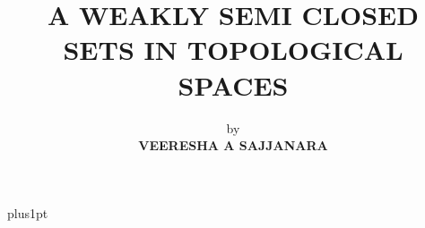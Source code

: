 \documentclass[oneside,12pt]{Classes/VTU}
\title{A WEAKLY SEMI CLOSED SETS IN TOPOLOGICAL SPACES}
\author{by \\ \vspace{1mm}\textbf{VEERESHA A SAJJANARA} \vspace{1mm}}
\theoremstyle{definition}
\begin{document}
\renewcommand\baselinestretch{1.2}
\baselineskip=18pt plus1pt

~ \maketitle

\setcounter{secnumdepth}{3}
\setcounter{tocdepth}{3}

~ \begin{romanpages}


~ \normalsize{\tableofcontents}
~ \normalsize{\listoffigures}
~ \normalsize{\listoftables}
~ \end{romanpages}













\end{document}
